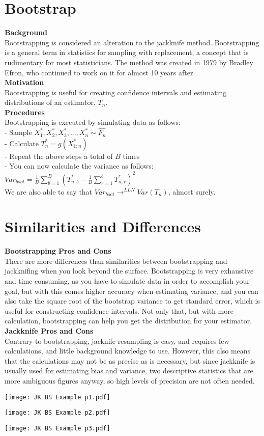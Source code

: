 \documentclass[12pt]{article}
\begin{document}
\begin{flushleft}
\section{Bootstrap}\label{sec:chapter}
\textbf{Background}\\
Bootstrapping is considered an alteration to the jackknife method. Bootstrapping is a general term in statistics for sampling with replacement, a concept that is rudimentary for most statisticians. The method was created in 1979 by Bradley Efron, who continued to work on it for almost 10 years after.\\
\textbf{Motivation}\\
Bootstrapping is useful for creating confidence intervals and estimating distributions of an estimator, \(T_n\).\\
\textbf{Procedures}\\
Bootstrapping is executed by simulating data as follows:\\
- Sample \(X^*_1, X^*_2, X^*_3,..., X^*_n \sim \hat{F_n}\)\\
- Calculate \(T^*_n = g(X^*_{1:n})\)\\
- Repeat the above steps a total of \(B\) times\\
- You can now calculate the variance as follows:\\
\(Var_{boot} = \frac{1}{B}\sum_{b=1}^{B}({T^*_{n, b} - \frac{1}{B}\sum_{r=1}^{b}{T^*_{n, r}}})^2\)\\
We are also able to say that \(Var_{boot} \rightarrow^{LLN} Var(T_n)\), almost surely.\\

\section{Similarities and Differences}\label{sec:chapter}
\textbf{Bootstrapping Pros and Cons}\\
There are more differences than similarities between bootstrapping and jackknifing when you look beyond the surface. Bootstrapping is very exhaustive and time-consuming, as you have to simulate data in order to accomplish your goal, but with this comes higher accuracy when estimating variance, and you can also take the square root of the bootstrap variance to get standard error, which is useful for constructing confidence intervals. Not only that, but with more calculation, bootstrapping can help you get the distribution for your estimator.\\
\textbf{Jackknife Pros and Cons}\\
Contrary to bootstrapping, jacknife resampling is easy, and requires few calculations, and little background knowledge to use. However, this also means that the calculations may not be as precise as is necessary, but since jackknife is usually used for estimating bias and variance, two descriptive statistics that are more ambiguous figures anyway, so high levels of precision are not often needed.
\centerline{\texttt{[image: JK BS Example p1.pdf]}}
\centerline{\texttt{[image: JK BS Example p2.pdf]}}
\centerline{\texttt{[image: JK BS Example p3.pdf]}}



\end{flushleft}
\end{document}
